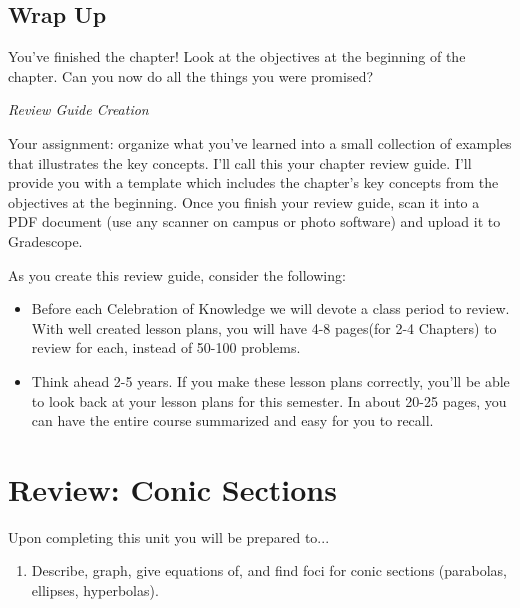 \documentclass[10pt,]{book}
\theoremstyle{plain}
\theoremstyle{definition}
\theoremstyle{definition}
\theoremstyle{definition}
\theoremstyle{definition}
\theoremstyle{definition}
\numberwithin{equation}{section}
\begin{document}
\section*{Wrap Up}
You've finished the chapter! Look at the objectives at the beginning of the chapter. Can you now do all the things you were promised?%
\par
\emph{Review Guide Creation}%
\par
Your assignment: organize what you've learned into a small collection of examples that illustrates the key concepts. I'll call this your chapter review guide. I'll provide you with a template which includes the chapter's key concepts from the objectives at the beginning. Once you finish your review guide, scan it into a PDF document (use any scanner on campus or photo software) and upload it to Gradescope. %
\par
As you create this review guide, consider the following: \leavevmode%
\begin{itemize}[label=\textbullet]
\item{}Before each Celebration of Knowledge  we will devote a class period to review. With well created lesson plans, you will have 4-8 pages(for 2-4 Chapters) to review for each, instead of 50-100 problems.%
\item{}Think ahead 2-5 years. If you make these lesson plans correctly, you'll be able to look back at your lesson plans for this semester. In about 20-25 pages, you can have the entire course summarized and easy for you to recall.%
\end{itemize}
%
\typeout{************************************************}
\typeout{************************************************}
\chapter[{Review: Conic Sections}]{Review: Conic Sections}\label{chapter-3}
Upon completing this unit you will be prepared to... \leavevmode%
\begin{enumerate}
\item\hypertarget{li-35}{}Describe, graph, give equations of, and find foci for conic sections (parabolas, ellipses, hyperbolas).%
\end{enumerate}
%
\typeout{************************************************}
\typeout{************************************************}
\end{document}

